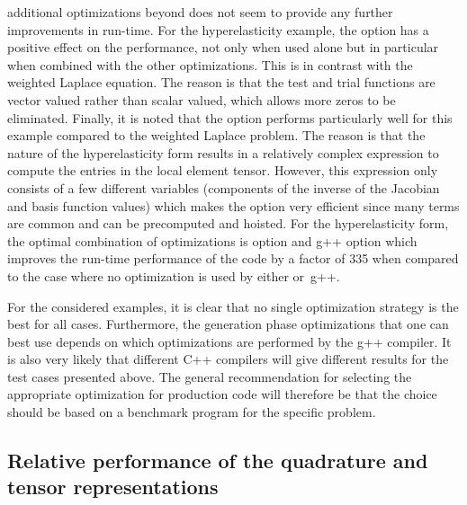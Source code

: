 additional optimizations beyond  does not seem to provide any
further improvements in run-time.  For the hyperelasticity example,
the option  has a positive effect on the performance, not
only when used alone but in particular when combined with the other
\ffc{} optimizations.  This is in contrast with the weighted Laplace
equation. The reason is that the test and trial functions are vector
valued rather than scalar valued, which allows more zeros to be
eliminated.  Finally, it is noted that the  option
performs particularly well for this example compared to the weighted
Laplace problem.  The reason is that the nature of the hyperelasticity
form results in a relatively complex expression to compute the entries
in the local element tensor.  However, this expression only consists
of a few different variables (components of the inverse of the
Jacobian and basis function values) which makes the 
option very efficient since many terms are common and can be
precomputed and hoisted.  For the hyperelasticity form, the optimal
combination of optimizations is \ffc{} option 
and g++ option  which improves the run-time
performance of the code by a factor of 335 when compared to the case
where no optimization is used by either \ffc{} or~g++.

For the considered examples, it is clear that no single optimization
strategy is the best for all cases.  Furthermore, the generation phase
optimizations that one can best use depends on which optimizations are
performed by the g++ compiler.  It is also very likely that different
C++ compilers will give different results for the test cases presented
above.  The general recommendation for selecting the appropriate
optimization for production code will therefore be that the choice
should be based on a benchmark program for the specific problem.

\subsection{Relative performance of the quadrature and tensor
  representations}
\label{oelgaard-2:sec:performance_of_representations}

